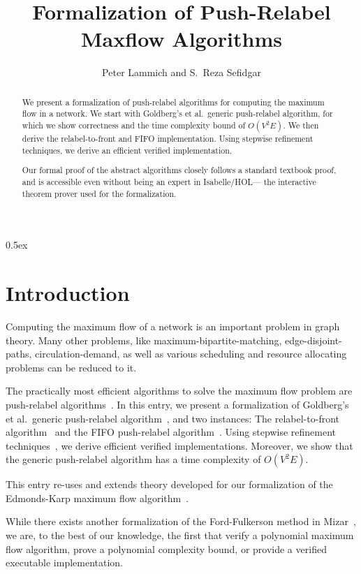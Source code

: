 \documentclass[11pt,a4paper]{article}
\begin{document}
\title{Formalization of Push-Relabel Maxflow Algorithms}
\author{Peter Lammich and S.~Reza Sefidgar}
\maketitle

\begin{abstract}
We present a formalization of push-relabel algorithms for computing the 
maximum flow in a network. We start with Goldberg's et al.~generic push-relabel
algorithm, for which we show correctness and the time complexity bound of 
$O(V^2E)$. We then derive the relabel-to-front and FIFO implementation.
Using stepwise refinement techniques, we derive an efficient verified 
implementation.

Our formal proof of the abstract algorithms closely follows a standard textbook 
proof, and is accessible even without being an expert 
in Isabelle/HOL--- the interactive theorem prover used for the formalization.
\end{abstract}

\clearpage
\tableofcontents

\clearpage

\parindent 0pt\parskip 0.5ex

\section{Introduction}
Computing the maximum flow of a network is an important problem in graph theory.
Many other problems, like maximum-bipartite-matching, edge-disjoint-paths,
circulation-demand, as well as various scheduling and resource allocating
problems can be reduced to it. 

The practically most efficient algorithms to solve the maximum flow problem
are push-relabel algorithms~\cite{ChGo97}. In this entry, we present 
a formalization of Goldberg's et al.\ generic push-relabel algorithm~\cite{GoTa88}, 
and two instances: The relabel-to-front algorithm~\cite{CLRS09} and the 
FIFO push-relabel algorithm~\cite{GoTa88}. 
Using stepwise refinement techniques~\cite{Wirth71,Back78,BaWr98}, we derive 
efficient verified implementations. Moreover, we show that the generic 
push-relabel algorithm has a time complexity of $O(V^2E)$.

This entry re-uses and extends theory developed for our formalization of
the Edmonds-Karp maximum flow algorithm~\cite{LaSe16,LaSe16_afp}.

While there exists another formalization of the Ford-Fulkerson method in
Mizar~\cite{Lee05}, we are, to the best of our knowledge, the first that verify
a polynomial maximum flow algorithm, prove a polynomial complexity bound, or
provide a verified executable implementation.
\end{document}
